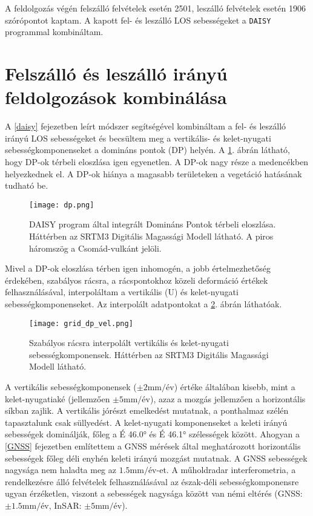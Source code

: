 \documentclass[12pt]{report}
\numberwithin{equation}{section}
\numberwithin{table}{section}
\numberwithin{figure}{section}
\begin{document}
A feldolgozás végén felszálló felvételek esetén 2501, leszálló felvételek esetén 1906 szórópontot kaptam. A kapott fel- és leszálló LOS sebességeket a \texttt{DAISY} programmal kombináltam.

\section{Felszálló és leszálló irányú feldolgozások kombinálása}

A \ref{daisy} fejezetben leírt módszer segítségével kombináltam a fel- és leszálló irányú LOS sebességeket és becsültem meg a vertikális- és kelet-nyugati sebességkomponenseket a domináns pontok (DP) helyén. A \ref{dps}. ábrán látható, hogy DP-ok térbeli eloszlása igen egyenetlen. A DP-ok nagy része a medencékben helyezkednek el. A DP-ok hiánya a magasabb területeken a vegetáció hatásának tudható be.

\begin{figure}[H]
    \centering
    \texttt{[image: dp.png]}
    \caption{DAISY program által integrált Domináns Pontok térbeli eloszlása. Háttérben az SRTM3 Digitális Magassági Modell \cite{SRTM} látható. A piros háromszög a Csomád-vulkánt jelöli.}\label{dps}
\end{figure}

Mivel a DP-ok eloszlása térben igen inhomogén, a jobb értelmezhetőség érdekében, szabályos rácsra, a rácspontokhoz közeli deformáció értékek felhasználásával, interpoláltam a vertikális (U) és kelet-nyugati sebességkomponenseket. Az interpolált adatpontokat a \ref{dp_vel}. ábrán láthatóak.

\begin{figure}[H]
    \centering
    \texttt{[image: grid\_dp\_vel.png]}
    \caption{Szabályos rácsra interpolált vertikális és kelet-nyugati sebességkomponensek. Háttérben az SRTM3 Digitális Magassági Modell \cite{SRTM} látható.}\label{dp_vel}
\end{figure}

A vertikális sebességkomponensek ($\pm 2 \text{mm}/\text{év}$) értéke általában kisebb, mint a kelet-nyugatiaké (jellemzően $\pm 5 \text{mm}/\text{év}$), azaz a mozgás jellemzően a horizontális síkban zajlik. A vertikális jórészt emelkedést mutatnak, a ponthalmaz szélén tapasztalunk csak süllyedést. A kelet-nyugati komponenseket a keleti irányú sebességek dominálják, főleg a É \ang{46.0} és É \ang{46.1} szélességek között. Ahogyan a \ref{GNSS} fejezetben említettem a GNSS mérések \cite{Hoeven2005, Schmitt2007} által meghatározott horizontális sebességek főleg déli enyhén keleti irányú mozgást mutatnak. A GNSS sebességek nagysága nem haladta meg az $1.5 \text{mm}/\text{év}$-et. A műholdradar interferometria, a rendelkezésre álló felvételek felhasználásával az észak-déli sebességkomponensre ugyan érzéketlen, viszont a sebességek nagysága között van némi eltérés (GNSS: $\pm 1.5 \text{mm}/\text{év}$, InSAR: $\pm 5 \text{mm}/\text{év}$).
\end{document}
